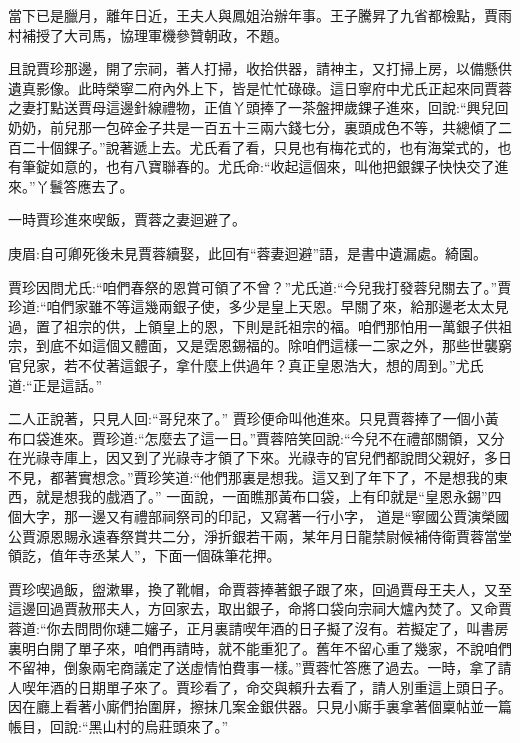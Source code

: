 \begin{parag}
    當下已是臘月，離年日近，王夫人與鳳姐治辦年事。王子騰昇了九省都檢點，賈雨村補授了大司馬，協理軍機參贊朝政，不題。
\end{parag}


\begin{parag}
    且說賈珍那邊，開了宗祠，著人打掃，收拾供器，請神主，又打掃上房，以備懸供遺真影像。此時榮寧二府內外上下，皆是忙忙碌碌。這日寧府中尤氏正起來同賈蓉之妻打點送賈母這邊針線禮物，正值丫頭捧了一茶盤押歲錁子進來，回說:“興兒回奶奶，前兒那一包碎金子共是一百五十三兩六錢七分，裏頭成色不等，共總傾了二百二十個錁子。”說著遞上去。尤氏看了看，只見也有梅花式的，也有海棠式的，也有筆錠如意的，也有八寶聯春的。尤氏命:“收起這個來，叫他把銀錁子快快交了進來。”丫鬟答應去了。
\end{parag}


\begin{parag}
    一時賈珍進來喫飯，賈蓉之妻迴避了。\begin{note}庚眉:自可卿死後未見賈蓉續娶，此回有“蓉妻迴避”語，是書中遺漏處。綺園。\end{note}賈珍因問尤氏:“咱們春祭的恩賞可領了不曾？”尤氏道:“今兒我打發蓉兒關去了。”賈珍道:“咱們家雖不等這幾兩銀子使，多少是皇上天恩。早關了來，給那邊老太太見過，置了祖宗的供，上領皇上的恩，下則是託祖宗的福。咱們那怕用一萬銀子供祖宗，到底不如這個又體面，又是霑恩錫福的。除咱們這樣一二家之外，那些世襲窮官兒家，若不仗著這銀子，拿什麼上供過年？真正皇恩浩大，想的周到。”尤氏道:“正是這話。”
\end{parag}


\begin{parag}
    二人正說著，只見人回:“哥兒來了。” 賈珍便命叫他進來。只見賈蓉捧了一個小黃布口袋進來。賈珍道:“怎麼去了這一日。”賈蓉陪笑回說:“今兒不在禮部關領，又分在光祿寺庫上，因又到了光祿寺才領了下來。光祿寺的官兒們都說問父親好，多日不見，都著實想念。”賈珍笑道:“他們那裏是想我。這又到了年下了，不是想我的東西，就是想我的戲酒了。” 一面說，一面瞧那黃布口袋，上有印就是“皇恩永錫”四個大字，那一邊又有禮部祠祭司的印記，又寫著一行小字，
    道是“寧國公賈演榮國公賈源恩賜永遠春祭賞共二分，淨折銀若干兩，某年月日龍禁尉候補侍衛賈蓉當堂領訖，值年寺丞某人”，下面一個硃筆花押。
\end{parag}


\begin{parag}
    賈珍喫過飯，盥漱畢，換了靴帽，命賈蓉捧著銀子跟了來，回過賈母王夫人，又至這邊回過賈赦邢夫人，方回家去，取出銀子，命將口袋向宗祠大爐內焚了。又命賈蓉道:“你去問問你璉二嬸子，正月裏請喫年酒的日子擬了沒有。若擬定了，叫書房裏明白開了單子來，咱們再請時，就不能重犯了。舊年不留心重了幾家，不說咱們不留神，倒象兩宅商議定了送虛情怕費事一樣。”賈蓉忙答應了過去。一時，拿了請人喫年酒的日期單子來了。賈珍看了，命交與賴升去看了，請人別重這上頭日子。因在廳上看著小廝們抬圍屏，擦抹几案金銀供器。只見小廝手裏拿著個稟帖並一篇帳目，回說:“黑山村的烏莊頭來了。”
\end{parag}


